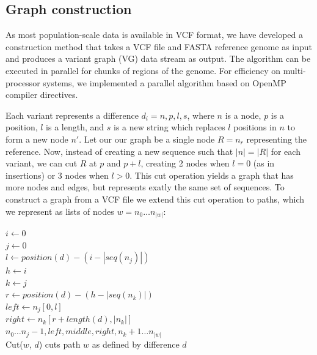 \documentclass{article}
\begin{document}
\subsection{Graph construction}

As most population-scale data is available in VCF format, we have developed a construction method that takes a VCF file and FASTA reference genome as input and produces a variant graph (VG) data stream as output.
The algorithm can be executed in parallel for chunks of regions of the genome. For efficiency on multi-processor systems, we implemented a parallel algorithm based on OpenMP compiler directives.

Each variant represents a difference $d_i = { n, p, l, s }$, where $n$ is a node, $p$ is a position, $l$ is a length, and $s$ is a new string which replaces $l$ positions in $n$ to form a new node $n'$.
Let our our graph be a single node $R = n_r$ representing the reference.
Now, instead of creating a new sequence such that $|n| = |R|$ for each variant, we can cut $R$ at $p$ and $p+l$, creating 2 nodes when $l = 0$ (as in insertions) or 3 nodes when $l > 0$.
This cut operation yields a graph that has more nodes and edges, but represents exatly the same set of sequences.
To construct a graph from a VCF file we extend this cut operation to paths, which we represent as lists of nodes $w = n_0 \ldots n_{|w|}$:

\begin{function}[h!]
  \label{func:cut}
  $i \gets 0$ \\
  $j \gets 0$ \\
  $l \gets position(d) - (i - |seq(n_j)|)$ \\
  $h \gets i$ \\
  $k \gets j$ \\
  $r \gets position(d) - (h - |seq(n_k)|)$ \\
  $left \gets n_j[0, l]$ \\
  $right \gets n_k[r+length(d), |n_k|]$ \\
  \Return $n_0\ldots n_j-1, left, middle, right, n_k+1\ldots n_{|w|}$ \\
  \caption{Cut($w$, $d$) cuts path $w$ as defined by difference $d$}
\end{function}
\end{document}
